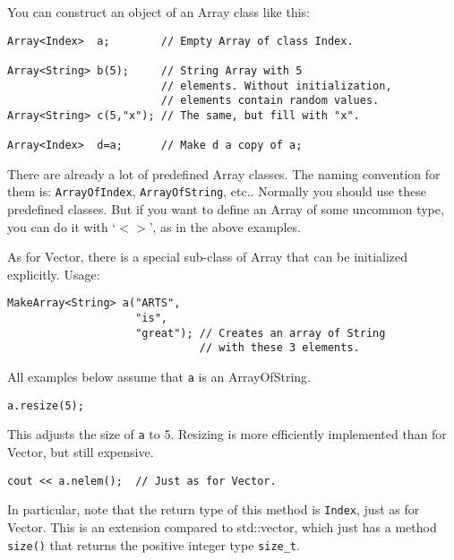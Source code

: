 You can construct an object of an Array class like this:

\begin{verbatim}
Array<Index>  a;        // Empty Array of class Index.

Array<String> b(5);     // String Array with 5
                        // elements. Without initialization, 
                        // elements contain random values.
Array<String> c(5,"x"); // The same, but fill with "x".

Array<Index>  d=a;      // Make d a copy of a;
\end{verbatim}

There are already a lot of predefined Array classes. The naming
convention for them is: \verb|ArrayOfIndex|, \verb|ArrayOfString|,
etc.. Normally you should use these predefined classes. But if you want
to define an Array of some uncommon type, you can do it with `$<>$',
as in the above examples. 

As for Vector, there is a special sub-class of Array that can be
initialized explicitly. Usage:

\begin{verbatim}
MakeArray<String> a("ARTS",
                    "is",
                    "great"); // Creates an array of String
                              // with these 3 elements.
\end{verbatim}


All examples below assume that \verb|a| is an ArrayOfString.

\begin{verbatim}
a.resize(5);
\end{verbatim}

This adjusts the size of \verb|a| to 5. Resizing is more efficiently
implemented than for Vector, but still expensive.

\begin{verbatim}
cout << a.nelem();  // Just as for Vector.
\end{verbatim}

In particular, note that the return type of this method is
\verb|Index|, just as for Vector. This is an extension compared to
std::vector, which just has a method \verb|size()| that returns the
positive integer type \verb|size_t|.


